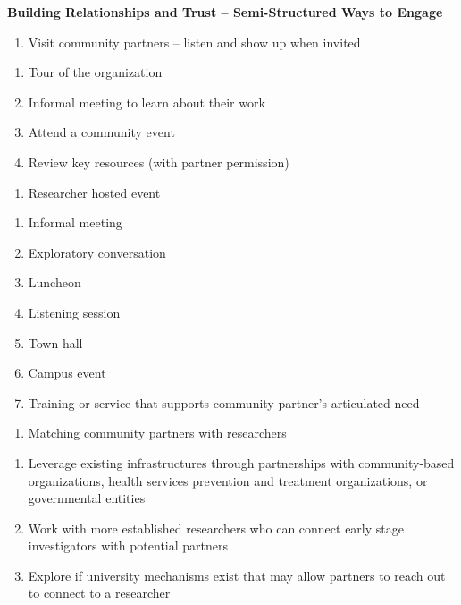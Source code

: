 \documentclass[
  11pt,
]{book}
\providecommand{\tightlist}{%
  \setlength{\itemsep}{0pt}\setlength{\parskip}{0pt}}
\begin{document}
\textbf{Building Relationships and Trust -- Semi-Structured Ways to Engage}

\begin{enumerate}
\def\labelenumi{\arabic{enumi}.}
\tightlist
\item
  Visit community partners -- listen and show up when invited
\end{enumerate}

\begin{enumerate}
\def\labelenumi{\alph{enumi}.}
\tightlist
\item
  Tour of the organization
\item
  Informal meeting to learn about their work
\item
  Attend a community event
\item
  Review key resources (with partner permission)
\end{enumerate}

\begin{enumerate}
\def\labelenumi{\arabic{enumi}.}
\setcounter{enumi}{1}
\tightlist
\item
  Researcher hosted event
\end{enumerate}

\begin{enumerate}
\def\labelenumi{\alph{enumi}.}
\tightlist
\item
  Informal meeting
\item
  Exploratory conversation
\item
  Luncheon
\item
  Listening session
\item
  Town hall
\item
  Campus event
\item
  Training or service that supports community partner's articulated need
\end{enumerate}

\begin{enumerate}
\def\labelenumi{\arabic{enumi}.}
\setcounter{enumi}{2}
\tightlist
\item
  Matching community partners with researchers
\end{enumerate}

\begin{enumerate}
\def\labelenumi{\alph{enumi}.}
\tightlist
\item
  Leverage existing infrastructures through partnerships with community-based organizations, health services prevention and treatment organizations, or governmental entities
\item
  Work with more established researchers who can connect early stage investigators with potential partners
\item
  Explore if university mechanisms exist that may allow partners to reach out to connect to a researcher
\end{enumerate}
\end{document}
